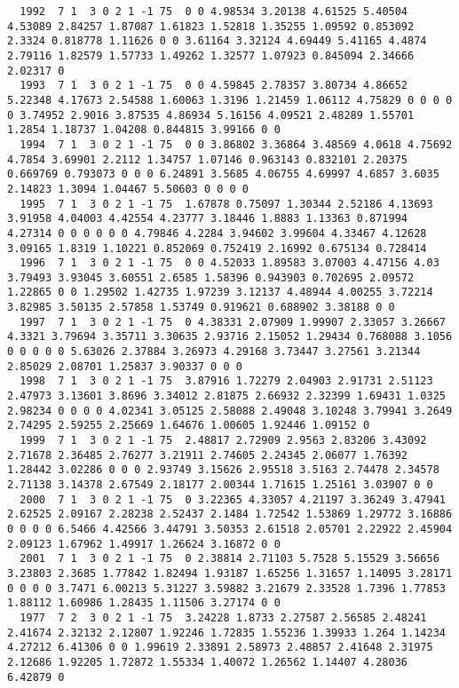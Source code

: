 \begin{landscape}
{\begin{verbatim}
  1992  7 1  3 0 2 1 -1 75  0 0 4.98534 3.20138 4.61525 5.40504 4.53089 2.84257 1.87087 1.61823 1.52818 1.35255 1.09592 0.853092 2.3324 0.818778 1.11626 0 0 3.61164 3.32124 4.69449 5.41165 4.4874 2.79116 1.82579 1.57733 1.49262 1.32577 1.07923 0.845094 2.34666 2.02317 0
  1993  7 1  3 0 2 1 -1 75  0 0 4.59845 2.78357 3.80734 4.86652 5.22348 4.17673 2.54588 1.60063 1.3196 1.21459 1.06112 4.75829 0 0 0 0 0 3.74952 2.9016 3.87535 4.86934 5.16156 4.09521 2.48289 1.55701 1.2854 1.18737 1.04208 0.844815 3.99166 0 0
  1994  7 1  3 0 2 1 -1 75  0 0 3.86802 3.36864 3.48569 4.0618 4.75692 4.7854 3.69901 2.2112 1.34757 1.07146 0.963143 0.832101 2.20375 0.669769 0.793073 0 0 0 6.24891 3.5685 4.06755 4.69997 4.6857 3.6035 2.14823 1.3094 1.04467 5.50603 0 0 0 0
  1995  7 1  3 0 2 1 -1 75  1.67878 0.75097 1.30344 2.52186 4.13693 3.91958 4.04003 4.42554 4.23777 3.18446 1.8883 1.13363 0.871994 4.27314 0 0 0 0 0 0 4.79846 4.2284 3.94602 3.99604 4.33467 4.12628 3.09165 1.8319 1.10221 0.852069 0.752419 2.16992 0.675134 0.728414
  1996  7 1  3 0 2 1 -1 75  0 0 4.52033 1.89583 3.07003 4.47156 4.03 3.79493 3.93045 3.60551 2.6585 1.58396 0.943903 0.702695 2.09572 1.22865 0 0 1.29502 1.42735 1.97239 3.12137 4.48944 4.00255 3.72214 3.82985 3.50135 2.57858 1.53749 0.919621 0.688902 3.38188 0 0
  1997  7 1  3 0 2 1 -1 75  0 4.38331 2.07909 1.99907 2.33057 3.26667 4.3321 3.79694 3.35711 3.30635 2.93716 2.15052 1.29434 0.768088 3.1056 0 0 0 0 0 5.63026 2.37884 3.26973 4.29168 3.73447 3.27561 3.21344 2.85029 2.08701 1.25837 3.90337 0 0 0
  1998  7 1  3 0 2 1 -1 75  3.87916 1.72279 2.04903 2.91731 2.51123 2.47973 3.13601 3.8696 3.34012 2.81875 2.66932 2.32399 1.69431 1.0325 2.98234 0 0 0 0 4.02341 3.05125 2.58088 2.49048 3.10248 3.79941 3.2649 2.74295 2.59255 2.25669 1.64676 1.00605 1.92446 1.09152 0
  1999  7 1  3 0 2 1 -1 75  2.48817 2.72909 2.9563 2.83206 3.43092 2.71678 2.36485 2.76277 3.21911 2.74605 2.24345 2.06077 1.76392 1.28442 3.02286 0 0 0 2.93749 3.15626 2.95518 3.5163 2.74478 2.34578 2.71138 3.14378 2.67549 2.18177 2.00344 1.71615 1.25161 3.03907 0 0
  2000  7 1  3 0 2 1 -1 75  0 3.22365 4.33057 4.21197 3.36249 3.47941 2.62525 2.09167 2.28238 2.52437 2.1484 1.72542 1.53869 1.29772 3.16886 0 0 0 0 6.5466 4.42566 3.44791 3.50353 2.61518 2.05701 2.22922 2.45904 2.09123 1.67962 1.49917 1.26624 3.16872 0 0
  2001  7 1  3 0 2 1 -1 75  0 2.38814 2.71103 5.7528 5.15529 3.56656 3.23803 2.3685 1.77842 1.82494 1.93187 1.65256 1.31657 1.14095 3.28171 0 0 0 0 3.7471 6.00213 5.31227 3.59882 3.21679 2.33528 1.7396 1.77853 1.88112 1.60986 1.28435 1.11506 3.27174 0 0
  1977  7 2  3 0 2 1 -1 75  3.24228 1.8733 2.27587 2.56585 2.48241 2.41674 2.32132 2.12807 1.92246 1.72835 1.55236 1.39933 1.264 1.14234 4.27212 6.41306 0 0 1.99619 2.33891 2.58973 2.48857 2.41648 2.31975 2.12686 1.92205 1.72872 1.55334 1.40072 1.26562 1.14407 4.28036  6.42879 0

\end{verbatim}}
\end{landscape}
